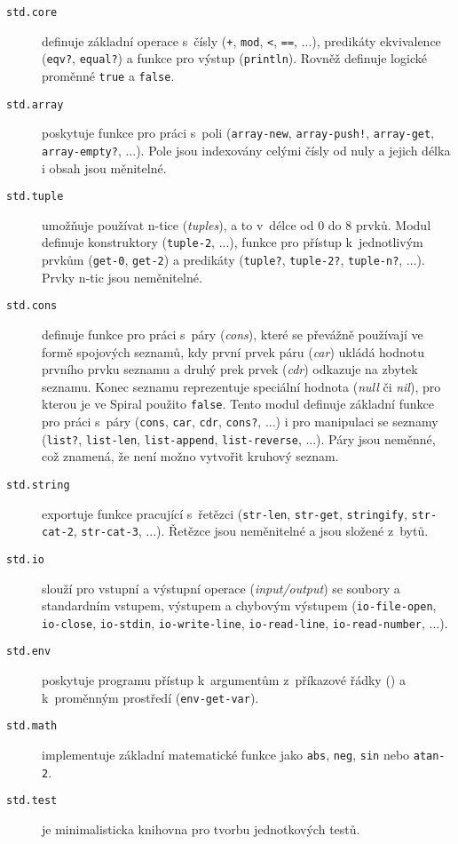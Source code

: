 \begin{description}
  \item[\texttt{std.core}] definuje základní operace s~čísly (\texttt{+},
    \texttt{mod}, \texttt{<}, \texttt{==}, ...), predikáty ekvivalence
    (\texttt{eqv?}, \texttt{equal?}) a funkce pro výstup (\texttt{println}).
    Rovněž definuje logické proměnné \texttt{true} a \texttt{false}.

  \item[\texttt{std.array}] poskytuje funkce pro práci s~poli
    (\texttt{array-new}, \texttt{array-push!}, \texttt{array-get},
    \texttt{array-empty?}, ...). Pole jsou indexovány celými čísly od nuly a
    jejich délka i obsah jsou měnitelné.

  \item[\texttt{std.tuple}] umožňuje používat n-tice (\emph{tuples}), a to
    v~délce od 0 do 8 prvků. Modul definuje konstruktory (\texttt{tuple-2},
    ...), funkce pro přístup k~jednotlivým prvkům (\texttt{get-0},
    \texttt{get-2}) a predikáty (\texttt{tuple?}, \texttt{tuple-2?},
    \texttt{tuple-n?}, ...). Prvky n-tic jsou neměnitelné.

  \item[\texttt{std.cons}] definuje funkce pro práci s~páry (\emph{cons}), které
    se převážně používají ve formě spojových seznamů, kdy první prvek páru
    (\emph{car}) ukládá hodnotu prvního prvku seznamu a druhý prek prvek
    (\emph{cdr}) odkazuje na zbytek seznamu. Konec seznamu reprezentuje
    speciální hodnota (\emph{null} či \emph{nil}), pro kterou je ve Spiral
    použito \texttt{false}. Tento modul definuje základní funkce pro práci
    s~páry (\texttt{cons}, \texttt{car}, \texttt{cdr}, \texttt{cons?}, ...) i
    pro manipulaci se seznamy (\texttt{list?}, \texttt{list-len},
    \texttt{list-append}, \texttt{list-reverse}, ...). Páry jsou neměnné, což
    znamená, že není možno vytvořit kruhový seznam.

  \item[\texttt{std.string}] exportuje funkce pracující s~řetězci
    (\texttt{str-len}, \texttt{str-get}, \texttt{stringify}, \texttt{str-cat-2},
    \texttt{str-cat-3}, ...). Řetězce jsou neměnitelné a jsou složené z~bytů.

  \item[\texttt{std.io}] slouží pro vstupní a výstupní operace
    (\emph{input/output}) se soubory a standardním vstupem, výstupem a chybovým
    výstupem (\texttt{io-file-open}, \texttt{io-close}, \texttt{io-stdin},
    \texttt{io-write-line}, \texttt{io-read-line}, \texttt{io-read-number},
    ...).

  \item[\texttt{std.env}] poskytuje programu přístup k~argumentům z~příkazové
    řádky () a k~proměnným prostředí (\texttt{env-get-var}).

  \item[\texttt{std.math}] implementuje základní matematické funkce jako
    \texttt{abs}, \texttt{neg}, \texttt{sin} nebo \texttt{atan-2}.

  \item[\texttt{std.test}] je minimalisticka knihovna pro tvorbu jednotkových
    testů.
\end{description}

